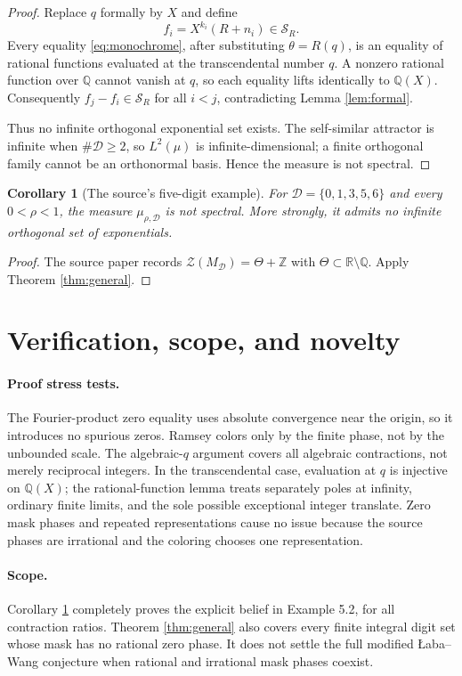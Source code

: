 \documentclass[11pt]{article}
\newtheorem{corollary}[theorem]{Corollary}
\newcommand{\Z}{\mathbb Z}
\newcommand{\Q}{\mathbb Q}
\newcommand{\R}{\mathbb R}
\begin{document}
\begin{proof}
Replace $q$ formally by $X$ and define
\[
 f_i=X^{k_i}(R+n_i)\in\mathcal S_R.
\]
Every equality \eqref{eq:monochrome}, after substituting
$\theta=R(q)$, is an equality of rational functions evaluated at the
transcendental number $q$.  A nonzero rational function over $\Q$ cannot
vanish at $q$, so each equality lifts identically to $\Q(X)$.  Consequently
$f_j-f_i\in\mathcal S_R$ for all $i<j$, contradicting Lemma
\ref{lem:formal}.

Thus no infinite orthogonal exponential set exists.  The self-similar
attractor is infinite when $\#\mathcal D\geq2$, so $L^2(\mu)$ is
infinite-dimensional; a finite orthogonal family cannot be an orthonormal
basis.  Hence the measure is not spectral.
\end{proof}

\begin{corollary}[The source's five-digit example]\label{cor:source}
For $\mathcal D=\{0,1,3,5,6\}$ and every $0<\rho<1$, the measure
$\mu_{\rho,\mathcal D}$ is not spectral.  More strongly, it admits no
infinite orthogonal set of exponentials.
\end{corollary}

\begin{proof}
The source paper records
$\mathcal Z(M_{\mathcal D})=\Theta+\Z$ with
$\Theta\subset\R\setminus\Q$.  Apply Theorem \ref{thm:general}.
\end{proof}

\section{Verification, scope, and novelty}

\paragraph{Proof stress tests.}
The Fourier-product zero equality uses absolute convergence near the origin,
so it introduces no spurious zeros.  Ramsey colors only by the finite phase,
not by the unbounded scale.  The algebraic-$q$ argument covers all algebraic
contractions, not merely reciprocal integers.  In the transcendental case,
evaluation at $q$ is injective on $\Q(X)$; the rational-function lemma treats
separately poles at infinity, ordinary finite limits, and the sole possible
exceptional integer translate.  Zero mask phases and repeated
representations cause no issue because the source phases are irrational and
the coloring chooses one representation.

\paragraph{Scope.}
Corollary \ref{cor:source} completely proves the explicit belief in Example
5.2, for all contraction ratios.  Theorem \ref{thm:general} also covers every
finite integral digit set whose mask has no rational zero phase.  It does not
settle the full modified {\L}aba--Wang conjecture when rational and irrational
mask phases coexist.
\end{document}
